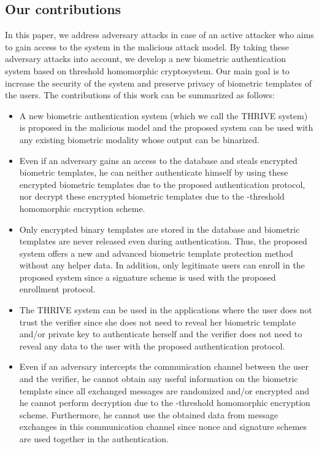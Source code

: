 \documentclass[journal]{IEEEtran}
\begin{document}
\subsection{Our contributions}

In this paper, we address adversary attacks in case of an active attacker who aims to gain access to the system in the malicious attack model. By taking these adversary attacks into account, we develop a new biometric authentication system based on threshold homomorphic cryptosystem. Our main goal is to increase the security of the system and preserve privacy of biometric templates of the users. The contributions of this work can be summarized as follows:

\begin{itemize}
\item A new biometric authentication system (which we call the THRIVE system) is proposed in the malicious model and the proposed system can be used with any existing biometric modality whose output can be binarized. 

\item Even if an adversary gains an access to the database and steals encrypted biometric templates,  he can neither authenticate himself by using these encrypted biometric templates due to the proposed authentication protocol, nor decrypt these encrypted biometric templates due to the -threshold homomorphic encryption scheme. 

\item Only encrypted binary templates are stored in the database and biometric templates are never released even during authentication. Thus, the proposed system offers a new and advanced biometric template protection method without any helper data. In addition, only legitimate users can enroll in the proposed system since a signature scheme is used with the proposed enrollment protocol.

\item The THRIVE system can be used in the applications where the user does not trust the verifier since she does not need to reveal her biometric template and/or private key to authenticate herself and  the verifier does not need to reveal any data to the user with the proposed authentication protocol. 

\item Even if an adversary intercepts the communication channel between the user and the verifier, he cannot obtain any useful information on the biometric template since all exchanged messages are randomized and/or encrypted and he cannot perform decryption due to the -threshold homomorphic encryption scheme. Furthermore, he cannot use the obtained data from message exchanges in this communication channel since nonce and signature schemes are used together in the authentication.


\end{itemize}
\end{document}
